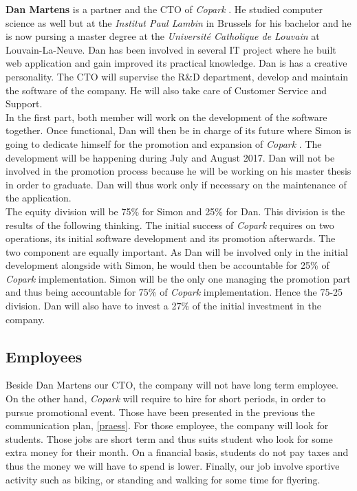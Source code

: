 \documentclass[12pt,a4paper,oneside]{book}
\newcommand{\bp}{\textit{Copark }}
\begin{document}
\textbf{Dan Martens} is a partner and the CTO of \bp. He studied computer science as well but at the \textit{Institut Paul Lambin} in Brussels for his bachelor and he is now pursing a master degree at the \textit{Université Catholique de Louvain} at Louvain-La-Neuve. Dan has been involved in several IT project where he built web application and gain improved its practical knowledge. Dan is has a creative personality. The CTO will supervise the R\&D department, develop and maintain the software of the company. He will also take care of Customer Service and Support.\\

In the first part, both member will work on the development of the software together. Once functional, Dan will then be in charge of its future where Simon is going to dedicate himself for the promotion and expansion of \bp. The development will be happening during July and August 2017. Dan will not be involved in the promotion process because he will be working on his master thesis in order to graduate. Dan will thus work only if necessary on the maintenance of the application.\\

The equity division will be 75\% for Simon and 25\% for Dan. This division is the results of the following thinking. The initial success of \bp requires on two operations, its initial software development and its promotion afterwards. The two component are equally important. As Dan will be involved only in the initial development alongside with Simon, he would then be accountable for 25\% of \bp implementation. Simon will be the only one managing the promotion part and thus being accountable for 75\% of \bp implementation. Hence the 75-25 division. Dan will also have to invest a 27\% of the initial investment in the company.

\subsection{Employees}

Beside Dan Martens our CTO, the company will not have long term employee. On the other hand, \bp will require to hire for short periods, in order to pursue promotional event. Those have been presented in the previous the communication plan, \autoref{praess}. For those employee, the company will look for students. Those jobs are short term and thus suits student who look for some extra money for their month. On a financial basis, students do not pay taxes and thus the money we will have to spend is lower. Finally, our job involve sportive activity such as biking, or standing and walking for some time for flyering.
\end{document}
